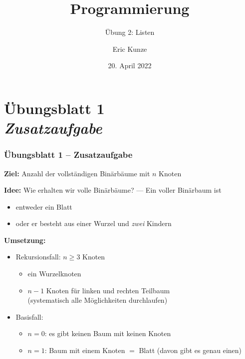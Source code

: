 \documentclass{beamer}
\begin{document}
	
	\title{Programmierung}
	\subtitle{Übung 2: Listen}
	\author{Eric Kunze}
	\date{20. April 2022}
	
	\maketitle



\section{Übungsblatt 1 \\ \textit{\normalsize Zusatzaufgabe}}

\begin{frame} \frametitle{Übungsblatt 1 -- Zusatzaufgabe}
	\footnotesize
	\textbf{Ziel:} Anzahl der vollständigen Binärbäume mit $n$ Knoten
	
	\textbf{Idee:} Wie erhalten wir volle Binärbäume? --- Ein voller Binärbaum ist
	\begin{itemize}
		\item entweder ein Blatt
		\item oder er besteht aus einer Wurzel und \textit{zwei} Kindern 
	\end{itemize}

	\textbf{Umsetzung:}  
	\begin{itemize}
		\item Rekursionsfall: $n \ge 3$ Knoten 
		\begin{itemize}
			\item ein Wurzelknoten
			\item $n-1$ Knoten für linken und rechten Teilbaum \\ (systematisch alle Möglichkeiten durchlaufen)
		\end{itemize}
		\item Basisfall: 
		\begin{itemize}
			\item $n = 0$: es gibt keinen Baum mit keinen Knoten
			\item $n = 1$: Baum mit einem Knoten $=$ Blatt (davon gibt es genau einen)
		\end{itemize}
	\end{itemize}
\end{frame}
\end{document}
